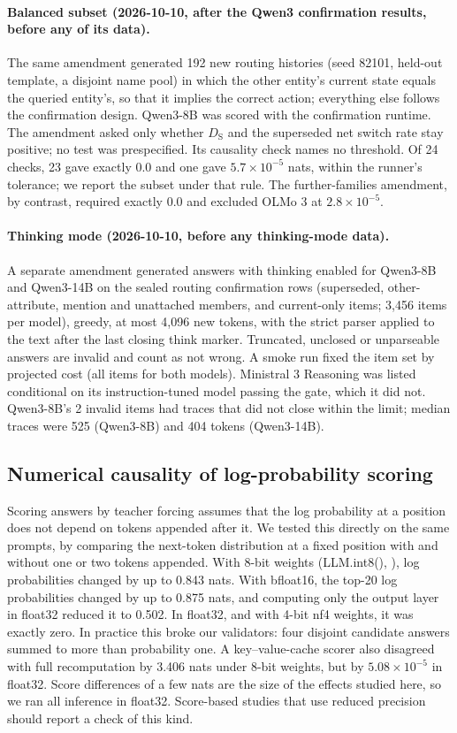 \paragraph{Balanced subset (2026-10-10, after the Qwen3 confirmation results, before any of its data).} The
same amendment generated 192 new routing histories (seed 82101, held-out template, a disjoint name pool) in
which the other entity's current state equals the queried entity's, so that it implies the correct action;
everything else follows the confirmation design. Qwen3-8B was scored with the confirmation runtime. The
amendment asked only whether $D_{\mathrm{S}}$ and the superseded net switch rate stay positive; no
test was prespecified. Its causality check names no threshold. Of 24 checks, 23 gave exactly 0.0 and one
gave $5.7\times10^{-5}$ nats, within the runner's tolerance; we report the subset under that rule. The
further-families amendment, by contrast, required exactly 0.0 and excluded OLMo 3 at $2.8\times10^{-5}$.

\paragraph{Thinking mode (2026-10-10, before any thinking-mode data).} A separate amendment generated
answers with thinking enabled for Qwen3-8B and Qwen3-14B on the sealed routing confirmation rows (superseded,
other-attribute, mention and unattached members, and current-only items; 3,456 items per model), greedy, at
most 4,096 new tokens, with the strict parser applied to the text after the last closing think marker.
Truncated, unclosed or unparseable answers are invalid and count as not wrong. A smoke run fixed the item
set by projected cost (all items for both models). Ministral 3 Reasoning was listed conditional on its
instruction-tuned model passing the gate, which it did not. Qwen3-8B's 2 invalid items had traces that did not
close within the limit; median traces were 525 (Qwen3-8B) and 404 tokens (Qwen3-14B).

\subsection{Numerical causality of log-probability scoring}
\label{app:precision}

Scoring answers by teacher forcing assumes that the log probability at a position does not depend on
tokens appended after it. We tested this directly on the same prompts, by comparing the next-token
distribution at a fixed position with and without one or two tokens appended. With 8-bit weights
(LLM.int8(), \citealp{dettmers2022llmint8}), log probabilities changed by up to 0.843 nats. With bfloat16, the
top-20 log probabilities changed by up to 0.875 nats, and computing only the output layer in float32 reduced it to
0.502. In float32, and with 4-bit nf4 weights, it was exactly zero. In practice this broke our
validators: four disjoint candidate answers summed to more than probability one. A key--value-cache
scorer also disagreed with full recomputation by 3.406 nats under 8-bit weights, but by
$5.08\times10^{-5}$ in float32. Score differences of a few nats are the size of the effects studied here,
so we ran all inference in float32. Score-based studies that use reduced precision should report a
check of this kind.
